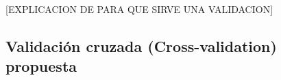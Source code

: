[EXPLICACION DE PARA QUE SIRVE UNA VALIDACION]

\subsection{Validación cruzada (Cross-validation) propuesta}
